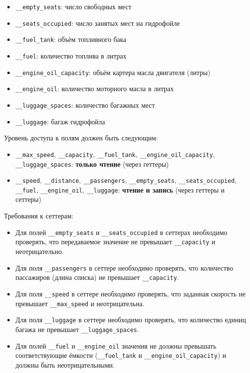 \begin{enumerate}
\begin{itemize}
    \item \texttt{\_\_empty\_seats}: число свободных мест  
    \item \texttt{\_\_seats\_occupied}: число занятых мест на гидрофойле  
    \item \texttt{\_\_fuel\_tank}: объём топливного бака  
    \item \texttt{\_\_fuel}: количество топлива в литрах  
    \item \texttt{\_\_engine\_oil\_capacity}: объём картера масла двигателя (литры)  
    \item \texttt{\_\_engine\_oil}: количество моторного масла в литрах  
    \item \texttt{\_\_luggage\_spaces}: количество багажных мест  
    \item \texttt{\_\_luggage}: багаж гидрофойла  
\end{itemize}
Уровень доступа к полям должен быть следующим:
\begin{itemize}
    \item \texttt{\_\_max\_speed}, \texttt{\_\_capacity}, \texttt{\_\_fuel\_tank}, \texttt{\_\_engine\_oil\_capacity}, \texttt{\_\_luggage\_spaces}: \textbf{только чтение} (через геттеры)  
    \item \texttt{\_\_speed}, \texttt{\_\_distance}, \texttt{\_\_passengers}, \texttt{\_\_empty\_seats}, \texttt{\_\_seats\_occupied}, \texttt{\_\_fuel}, \texttt{\_\_engine\_oil}, \texttt{\_\_luggage}: \textbf{чтение и запись} (через геттеры и сеттеры)
\end{itemize}
Требования к сеттерам:
\begin{itemize}
    \item Для полей \texttt{\_\_empty\_seats} и \texttt{\_\_seats\_occupied} в сеттерах необходимо проверять, что передаваемое значение не превышает \texttt{\_\_capacity} и неотрицательно.  
    \item Для поля \texttt{\_\_passengers} в сеттере необходимо проверять, что количество пассажиров (длина списка) не превышает \texttt{\_\_capacity}.  
    \item Для поля \texttt{\_\_speed} в сеттере необходимо проверять, что заданная скорость не превышает \texttt{\_\_max\_speed} и неотрицательна.  
    \item Для поля \texttt{\_\_luggage} в сеттере необходимо проверять, что количество единиц багажа не превышает \texttt{\_\_luggage\_spaces}.
    \item Для полей \texttt{\_\_fuel} и \texttt{\_\_engine\_oil} значения не должны превышать соответствующие ёмкости (\texttt{\_\_fuel\_tank} и \texttt{\_\_engine\_oil\_capacity}) и должны быть неотрицательными.

\end{itemize}
\end{enumerate}
